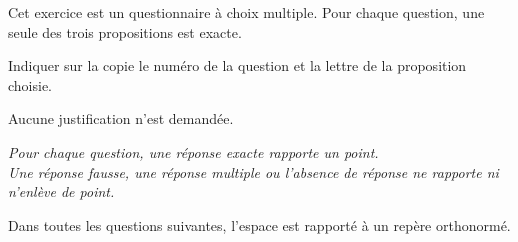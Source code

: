 \medskip

Cet exercice est un questionnaire à choix multiple. Pour chaque question, une seule des trois propositions est exacte.

Indiquer sur la copie le numéro de la question et la lettre de la proposition
choisie.

Aucune justification n'est demandée.

\medskip

\emph{Pour chaque question, une réponse exacte rapporte un point.\\
Une réponse fausse, une réponse multiple ou l'absence de réponse ne rapporte ni n'enlève de point.}

\medskip

Dans toutes les questions suivantes, l'espace est rapporté à un repère orthonormé.

\medskip

